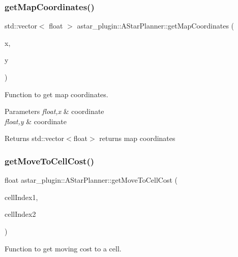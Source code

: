 \subsubsection{\texorpdfstring{get\+Map\+Coordinates()}{getMapCoordinates()}}
{\footnotesize\ttfamily std\+::vector$<$ float $>$ astar\+\_\+plugin\+::\+A\+Star\+Planner\+::get\+Map\+Coordinates (\begin{DoxyParamCaption}\item[{float}]{x,  }\item[{float}]{y }\end{DoxyParamCaption})}



Function to get map coordinates. 


\begin{DoxyParams}{Parameters}
{\em float,x} & coordinate \\
\hline
{\em float,y} & coordinate \\
\hline
\end{DoxyParams}
\begin{DoxyReturn}{Returns}
std\+::vector$<$float$>$ returns map coordinates 
\end{DoxyReturn}
\mbox{\label{classastar__plugin_1_1_a_star_planner_ad07f32fd3a1e44ef3bb9bb1e59237023}} 
\subsubsection{\texorpdfstring{get\+Move\+To\+Cell\+Cost()}{getMoveToCellCost()}\hspace{0.1cm}{\footnotesize\ttfamily [1/2]}}
{\footnotesize\ttfamily float astar\+\_\+plugin\+::\+A\+Star\+Planner\+::get\+Move\+To\+Cell\+Cost (\begin{DoxyParamCaption}\item[{int}]{cell\+Index1,  }\item[{int}]{cell\+Index2 }\end{DoxyParamCaption})}



Function to get moving cost to a cell. 


